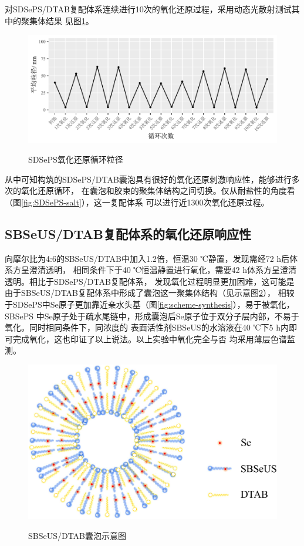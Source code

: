 \documentclass[bachelor,winfonts,replaceperiod]{jnuthesis}
\begin{document}
    对SDSePS/DTAB复配体系连续进行10次的氧化还原过程，采用动态光散射测试其中的聚集体结果
    见图\ref{fig:SDSePS-redox-circle}。
    \begin{figure}[htbp]
        \centering
        \includegraphics[width=.86\textwidth]{figure/SDSePS-redox-circle.pdf}\\
        \caption{SDSePS氧化还原循环粒径}\label{fig:SDSePS-redox-circle}
    \end{figure}
    从中可知构筑的SDSePS/DTAB囊泡具有很好的氧化还原刺激响应性，能够进行多次的氧化还原循环，
    在囊泡和胶束的聚集体结构之间切换。仅从耐盐性的角度看（图\ref{fig:SDSePS-salt}），这一复配体系
    可以进行近1300次氧化还原过程。
    
    \subsection{SBSeUS/DTAB复配体系的氧化还原响应性}
    向摩尔比为4:6的SBSeUS/DTAB中加入1.2倍，恒温30 ℃静置，发现需经72 h后体系方呈澄清透明，
    相同条件下于40 ℃恒温静置进行氧化，需要42 h体系方呈澄清透明。相比于SDSePS/DTAB复配体系，
    发现氧化过程明显更加困难，这可能是由于SBSeUS/DTAB复配体系中形成了囊泡这一聚集体结构（见示意图\ref{fig:scheme-vesicle}），
    相较于SDSePS中Se原子更加靠近亲水头基（图\ref{fig:scheme-synthesis}），易于被氧化，SBSePS
    中Se原子处于疏水尾链中，形成囊泡后Se原子位于双分子层内部，不易于氧化。同时相同条件下，同浓度的
    表面活性剂SBSeUS的水溶液在40 ℃下5 h内即可完成氧化，这也印证了以上说法。以上实验中氧化完全与否
    均采用薄层色谱监测。
    \begin{figure}[htbp]
        \centering
        \includegraphics[width=0.46\linewidth]{figure/vesicle-scheme.pdf}\\
        \caption{SBSeUS/DTAB囊泡示意图}\label{fig:scheme-vesicle}
    \end{figure}
    
\end{document}
